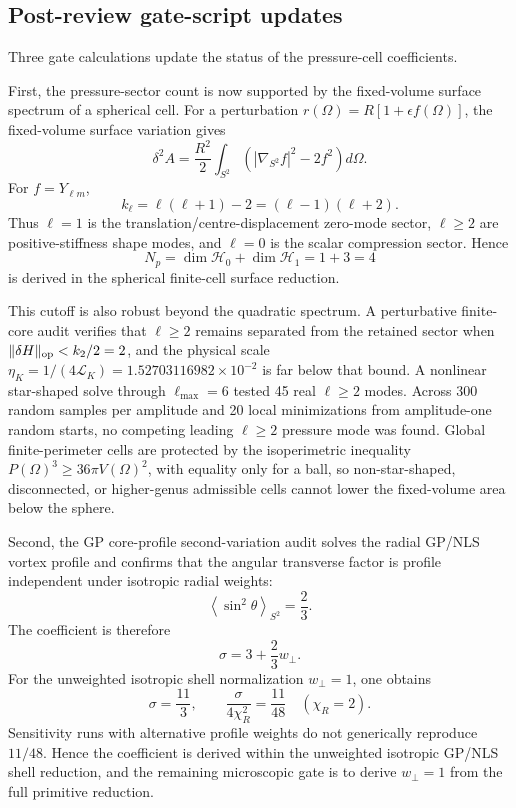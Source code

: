 \documentclass[11pt]{article}
\begin{document}
\subsection{Post-review gate-script updates}
\label{subsec:post-review-gate-updates}

Three gate calculations update the status of the pressure-cell coefficients.

First, the pressure-sector count is now supported by the fixed-volume surface
spectrum of a spherical cell.  For a perturbation
\(r(\Omega)=R[1+\epsilon f(\Omega)]\), the fixed-volume surface variation gives
\[
  \delta^2 A
  =
  \frac{R^2}{2}
  \int_{S^2}
  \left(|\nabla_{S^2}f|^2-2f^2\right)d\Omega .
\]
For \(f=Y_{\ell m}\),
\[
  k_\ell=\ell(\ell+1)-2=(\ell-1)(\ell+2).
\]
Thus \(\ell=1\) is the translation/centre-displacement zero-mode sector,
\(\ell\ge2\) are positive-stiffness shape modes, and \(\ell=0\) is the scalar
compression sector.  Hence
\[
  N_p=\dim\mathcal H_0+\dim\mathcal H_1=1+3=4
\]
is derived in the spherical finite-cell surface reduction.

This cutoff is also robust beyond the quadratic spectrum.  A perturbative
finite-core audit verifies that \(\ell\ge2\) remains separated from the retained
sector when \(\|\delta H\|_{\rm op}<k_2/2=2\), and the physical scale
\(\eta_K=1/(4\mathcal L_K)=1.52703116982\times10^{-2}\) is far below that
bound.  A nonlinear star-shaped solve through \(\ell_{\max}=6\) tested 45 real
\(\ell\ge2\) modes.  Across 300 random samples per amplitude and 20 local
minimizations from amplitude-one random starts, no competing leading
\(\ell\ge2\) pressure mode was found.  Global finite-perimeter cells are
protected by the isoperimetric inequality \(P(\Omega)^3\ge36\pi V(\Omega)^2\),
with equality only for a ball, so non-star-shaped, disconnected, or higher-genus
admissible cells cannot lower the fixed-volume area below the sphere.


Second, the GP core-profile second-variation audit solves the radial GP/NLS
vortex profile and confirms that the angular transverse factor is profile
independent under isotropic radial weights:
\[
  \left\langle\sin^2\theta\right\rangle_{S^2}=\frac23.
\]
The coefficient is therefore
\[
  \sigma=3+\frac23 w_\perp.
\]
For the unweighted isotropic shell normalization \(w_\perp=1\), one obtains
\[
  \sigma=\frac{11}{3},
  \qquad
  \frac{\sigma}{4\chi_R^2}=\frac{11}{48}
  \quad(\chi_R=2).
\]
Sensitivity runs with alternative profile weights do not generically reproduce
\(11/48\).  Hence the coefficient is derived within the unweighted isotropic
GP/NLS shell reduction, and the remaining microscopic gate is to derive
\(w_\perp=1\) from the full primitive reduction.
\end{document}
